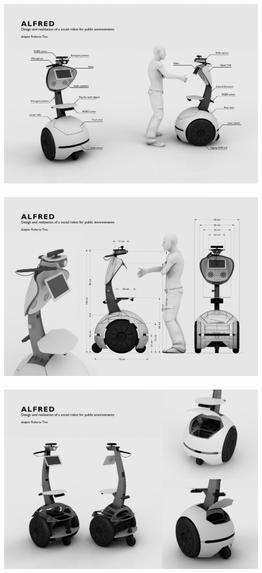 \begin{center}
\includegraphics[height=10cm]{fig/Tavola01.jpg}\\ \vspace{0.5cm}
\includegraphics[height=10cm]{fig/Tavola02.jpg}\\ \vspace{0.5cm}
\includegraphics[height=10cm]{fig/Tavola03.jpg}\\ \vspace{0.5cm}

\end{center}
